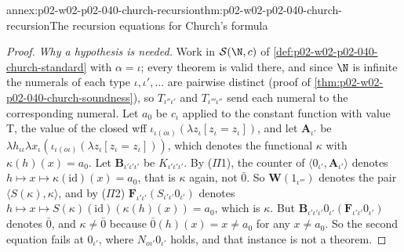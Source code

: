 \begin{annexitem}{annex:p02-w02-p02-040-church-recursion}{thm:p02-w02-p02-040-church-recursion}{The recursion equations for Church's formula}
\begin{proof}
\emph{Why a hypothesis is needed.}  Work in \(\mathcal S(\N,c)\) of
\cref{def:p02-w02-p02-040-church-standard} with \(\alpha=\iota\); every
theorem is valid there, and since \(\N\) is infinite the numerals of each type
\(\iota,\iota',\ldots\) are pairwise distinct (proof of
\cref{thm:p02-w02-p02-040-church-soundness}), so
\(T_{\iota''\iota'}\) and \(T_{\iota'''\iota''}\) send each numeral to the
corresponding numeral.  Let \(a_0\) be \(c_\iota\) applied to the constant function with value \(\mathrm T\), the value
of the closed wff \(\iota_{\iota(o\iota)}(\lambda z_\iota[z_\iota=z_\iota])\), and
let \(\mathbf A_{\iota'}\) be
\(\lambda h_{\iota\iota}\lambda x_\iota(\iota_{\iota(o\iota)}(\lambda z_\iota[z_\iota=z_\iota]))\),
which denotes the functional \(\kappa\) with \(\kappa(h)(x)=a_0\).  Let
\(\mathbf B_{\iota'\iota'\iota'}\) be \(K_{\iota'\iota'\iota'}\).  By (\(\Pi\)1), the
counter of \(\langle0_{\iota'},\mathbf A_{\iota'}\rangle\) denotes
\(h\mapsto x\mapsto\kappa(\mathrm{id})(x)=a_0\), that is \(\kappa\) again, not
\(\bar0\).  So \(\mathbf W(1_{\iota'''})\) denotes the pair
\(\langle S(\kappa),\kappa\rangle\), and by (\(\Pi\)2)
\(\mathbf F_{\iota'\iota'}(S_{\iota'\iota'}0_{\iota'})\) denotes
\(h\mapsto x\mapsto S(\kappa)(\mathrm{id})(\kappa(h)(x))=a_0\), which is
\(\kappa\).  But \(\mathbf B_{\iota'\iota'\iota'}0_{\iota'}(\mathbf F_{\iota'\iota'}0_{\iota'})\)
denotes \(\bar0\), and \(\kappa\neq\bar0\) because \(\bar0(h)(x)=x\neq a_0\) for
any \(x\neq a_0\).  So the second equation fails at \(0_{\iota'}\), where
\(N_{o\iota'}0_{\iota'}\) holds, and that instance is not a theorem.
\end{proof}
\end{annexitem}

